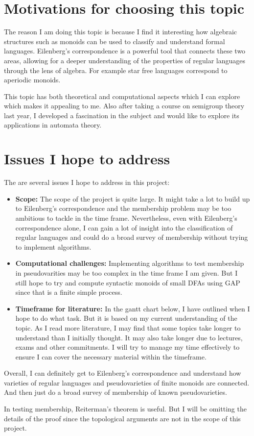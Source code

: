 \section{Motivations for choosing this topic}
The reason I am doing this topic is because I find it interesting how algebraic structures such as monoids can be used to classify and understand formal languages.
Eilenberg's correspondence is a powerful tool that connects these two areas, allowing for a deeper understanding of the properties of regular languages through the lens of algebra.
For example star free languages correspond to aperiodic monoids.

This topic has both theoretical and computational aspects which I can explore which makes it appealing to me. Also after taking
a course on semigroup theory last year, I developed a fascination in the subject and would like to explore its applications in automata theory.

\section{Issues I hope to address}
The are several issues I hope to address in this project:
\begin{itemize}
    \item {\bf Scope:} The scope of the project is quite large. It might take a lot to build up to Eilenberg's correspondence and the membership problem may be too ambitious to tackle in the time frame. 
    Nevertheless, even with Eilenberg's correspondence alone, I can gain a lot of insight into the classification of regular languages and could do a broad survey of membership without trying to implement algorithms.
    \item {\bf Computational challenges:} Implementing algorithms to test membership in pseudovarities may be too complex in the time frame I am given. But I still hope to try and compute syntactic monoids of small DFAs using GAP since that is a finite simple process.
    \item {\bf Timeframe for literature:} In the gantt chart below, I have outlined when I hope to do what task. But it is based on my current understanding of the topic. As I read more literature, I may find that some topics take longer to understand than I initially thought.
    It may also take longer due to lectures, exams and other commitments. I will try to manage my time effectively to ensure I can cover the necessary material within the timeframe.
 \end{itemize}

Overall, I can definitely get to Eilenberg's correspondence and understand how varieties of regular languages and pseudovarieties of finite monoids are connected. And then just do a broad survey of membership of known pseudovarieties.

 In testing membership, Reiterman's theorem is useful. But I will be omitting the details of the proof since the topological arguments are not in the scope of this project.